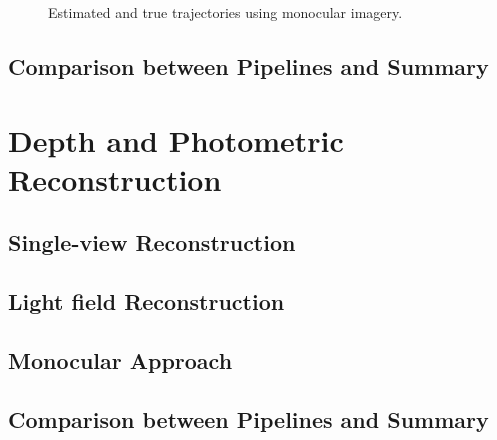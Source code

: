 \begin{figure}[H]
    \caption{Estimated and true trajectories using monocular imagery.}
    \setcounter{subfigure}{0}
\end{figure}



\subsection{Comparison between Pipelines and Summary}

\section{Depth and Photometric Reconstruction}

\subsection{Single-view Reconstruction}
\subsection{Light field Reconstruction}
\subsection{Monocular Approach}

\subsection{Comparison between Pipelines and Summary}





